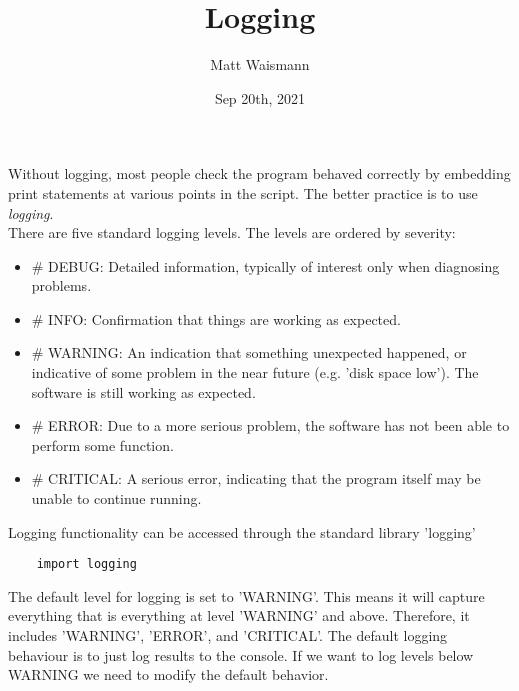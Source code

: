 \documentclass{article}%
\title{Logging}
\date{Sep 20th, 2021}
\author{Matt Waismann}
\begin{document}
\maketitle
Without logging, most people check the program behaved correctly by embedding print statements at various points in the script. The better practice is to use \textit{logging}. \\

There are five standard logging levels. The levels are ordered by severity:
\begin{itemize}
  \item \# DEBUG: Detailed information, typically of interest only when diagnosing problems.
  \item \# INFO: Confirmation that things are working as expected.
  \item \# WARNING: An indication that something unexpected happened, or indicative of some problem in the near future (e.g. 'disk space low'). The software is still working as expected.
  \item \# ERROR: Due to a more serious problem, the software has not been able to perform some function.
  \item \# CRITICAL: A serious error, indicating that the program itself may be unable to continue running.
\end{itemize}
Logging functionality can be accessed through the standard library 'logging'
\begin{lstlisting}
    import logging
\end{lstlisting}
The default level for logging is set to 'WARNING'. This means it will capture everything that is everything at level 'WARNING' and above. Therefore, it includes 'WARNING', 'ERROR', and 'CRITICAL'. The default logging behaviour is to just log results to the console. If we want to log levels below WARNING we need to modify the default behavior. \\
\end{document}
